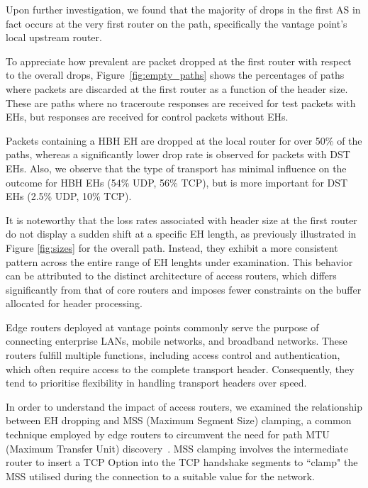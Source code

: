 \documentclass[conference]{IEEEtran}
\begin{document}
Upon further investigation, we found that the majority of drops in the first AS
in fact occurs at the very first router on the path, specifically the vantage
point's local upstream router.

To appreciate how prevalent are packet dropped at the first router with respect
to the overall drops, Figure~\ref{fig:empty_paths} shows the percentages of
paths where packets are discarded at the first router as a function of the
header size.  These are paths where no traceroute responses are received for
test packets with EHs, but responses are received for control packets without
EHs.

Packets containing a HBH EH are dropped at the local router for over 50\% of
the paths, whereas a significantly lower drop rate is observed for packets with
DST EHs.  Also, we observe that the type of transport has minimal influence on
the outcome for HBH EHs (54\% UDP, 56\% TCP), but is more important for DST EHs
(2.5\% UDP, 10\% TCP).

It is noteworthy that the loss rates associated with header size at the first
router do not display a sudden shift at a specific EH length, as previously
illustrated in Figure \ref{fig:sizes} for the overall path. Instead, they
exhibit a more consistent pattern across the entire range of EH lenghts under
examination.  This behavior can be attributed to the distinct architecture of
access routers, which differs significantly from that of core routers and
imposes fewer constraints on the buffer allocated for header processing.


Edge routers deployed at vantage points commonly serve the purpose of
connecting enterprise LANs, mobile networks, and broadband networks. These
routers fulfill multiple functions, including access control and
authentication, which often require access to the complete transport header.
Consequently, they tend to prioritise flexibility in handling transport headers
over speed.

In order to understand the impact of access routers, we examined the
relationship between EH dropping and MSS (Maximum Segment Size) clamping, a
common technique employed by edge routers to circumvent the need for path MTU
(Maximum Transfer Unit) discovery~\cite{custura-mtu}.  MSS clamping involves
the intermediate router to insert a TCP Option into the TCP handshake segments
to ``clamp" the MSS utilised during the connection to a suitable value for the
network.
\end{document}
